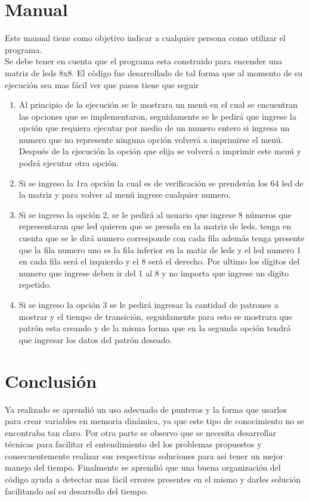 \documentclass{article}
\begin{document}
\section{Manual}
Este manual tiene como objetivo indicar a cualquier persona como utilizar el programa.\\
Se debe tener en cuenta que el programa esta construido para encender una matriz de leds 8x8. El código fue desarrollado de tal forma que al momento de su ejecución sea mas fácil ver que pasos tiene que seguir\\
\begin{enumerate}
    \item Al principio  de la ejecución se le mostrara un menú en el cual se encuentran las opciones que se implementaron, seguidamente se le pedirá que ingrese la opción que requiera ejecutar por medio de un numero entero si ingresa un numero que no represente ninguna opción volverá a imprimirse el menú. Después de la ejecución la opción que elija se volverá a imprimir este menú y podrá ejecutar otra opción.\\
    \item Si se ingreso la 1ra opción la cual es de verificación se prenderán los 64 led de la matriz y para volver al menú ingrese cualquier numero.
    \item Si se ingreso la opción 2, se le pedirá al usuario que ingrese 8 números que representaran que led quieren que se prenda en la matriz de leds. tenga en cuenta que se le dirá numero corresponde con cada fila además tenga presente que la fila numero uno es la fila inferior en la matiz de leds y el led numero 1 en cada fila será el izquierdo y el 8 será el derecho. Por ultimo los dígitos del numero que ingrese deben ir del 1 al 8 y no importa que ingrese un digito repetido.
    \item Si se ingreso la opción 3 se le pedirá ingresar la cantidad de patrones a mostrar y el tiempo de transición, seguidamente para esto se mostrara que patrón esta creando y de la misma forma que en la segunda opción tendrá que ingresar los datos del patrón deseado.
\end{enumerate}



\newpage

\section{Conclusión}
Ya realizado se aprendió un uso adecuado de punteros y la forma que usarlos para crear variables en memoria dinámica, ya que este tipo de conocimiento no se encontraba tan claro. Por otra parte se observo que se necesita desarrollar técnicas para facilitar el entendimiento del los problemas propuestos y consecuentemente realizar sus respectivas soluciones para así tener un mejor manejo del tiempo. Finalmente se aprendió que una buena organización del código ayuda a detectar mas fácil errores presentes en el mismo y darles solución facilitando así su desarrollo del tiempo.
\end{document}
